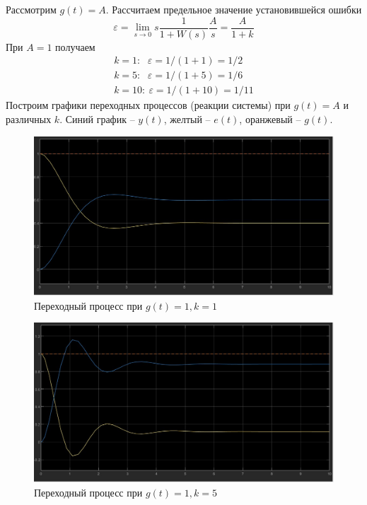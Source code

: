 \documentclass[a4paper, 12pt]{article}
\begin{document}
    Рассмотрим $g(t)=A$. Рассчитаем предельное значение установившейся ошибки
    $$\varepsilon=\lim\limits_{s\rightarrow0}s\dfrac{1}{1+W(s)}\dfrac{A}{s}=\dfrac{A}{1+k}$$
    При $A=1$ получаем
    $$
    \begin{matrix}
        k=1:\ \ \, \varepsilon=1/(1+1)=1/2\\
        k=5:\ \ \, \varepsilon=1/(1+5)=1/6\\
        k=10:\ \varepsilon=1/(1+10)=1/11
    \end{matrix}
    $$
    Построим графики переходных процессов (реакции системы) при $g(t)=A$ и различных $k$. Синий график -- $y(t)$, желтый -- $e(t)$, оранжевый -- $g(t)$.
    \begin{figure}[H]
        \centering
        \includegraphics[scale=0.3]{task_1_g=1_k=1.jpg}
        \captionsetup{skip=0pt}
        \caption{Переходный процесс при $g(t)=1,k=1$}
        \label{fig:t1g1k1}
    \end{figure}
    \begin{figure}[H]
        \centering
        \includegraphics[scale=0.3]{task_1_g=1_k=5.jpg}
        \captionsetup{skip=0pt}
        \caption{Переходный процесс при $g(t)=1,k=5$}
        \label{fig:t1g1k5}
    \end{figure}
\end{document}
